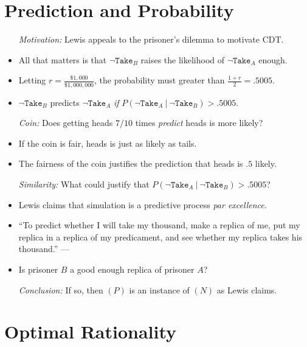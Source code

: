 \documentclass[a4paper, 11pt]{article} %
\begin{document}
\section*{Prediction and Probability}

\begin{itemize}
  \item[\it Motivation:] Lewis appeals to the prisoner's dilemma to motivate CDT. 
    \item All that matters is that $\neg \texttt{Take}_B$ raises the likelihood of $\neg \texttt{Take}_A$ enough. 
    \item Letting $r = \frac{\$1,000}{\$1,000,000}$, the probability must greater than $\frac{1 + r}{2} = .5005$. 
    \item $\neg \texttt{Take}_B$ predicts $\neg \texttt{Take}_A$ \textit{if} $P(\neg \texttt{Take}_A\ |\ \neg \texttt{Take}_B) > .5005$. 
  \item[\it Coin:] Does getting heads $7/10$ times \textit{predict} heads is more likely? 
    \item If the coin is fair, heads is just as likely as tails.
    \item The fairness of the coin justifies the prediction that heads is $.5$ likely. 
  \item[\it Similarity:] What could justify that $P(\neg \texttt{Take}_A\ |\ \neg \texttt{Take}_B) > .5005$?
    \item Lewis claims that simulation is a predictive process \textit{par excellence}.
    \item ``To predict whether I will take my thousand, make a replica of me, put my replica in a replica of my predicament, and see whether my replica takes his thousand.'' ---\citet[p.~237]{Lewis1979a}
    \item Is prisoner $B$ a good enough replica of prisoner $A$?
  \item[\it Conclusion:] If so, then $(P)$ is an instance of $(N)$ as Lewis claims.
\end{itemize}






\section*{Optimal Rationality}
\end{document}
